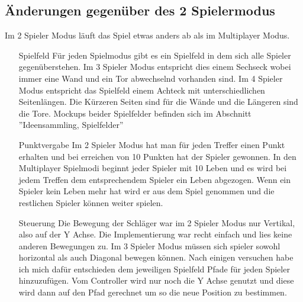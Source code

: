 \subsection{Änderungen gegenüber des 2 Spielermodus}
Im 2 Spieler Modus läuft das Spiel etwas anders ab als im Multiplayer Modus.
\begin{enumerate}
	\item[Spielfeld]
	Für jeden Spielmodus gibt es ein Spielfeld in dem sich alle Spieler gegenüberstehen.
	\newline
	Im 3 Spieler Modus entspricht dies einem Sechseck wobei immer eine Wand und ein Tor abwechselnd vorhanden sind.
	\newline
	Im 4 Spieler Modus entspricht das Spielfeld einem Achteck mit unterschiedlichen Seitenlängen. Die Kürzeren Seiten sind für die Wände und die Längeren sind die Tore.
	\newline
	Mockups beider Spielfelder befinden sich im Abschnitt ''Ideensammling, Spielfelder''
	
	\item[Punktvergabe]
	Im 2 Spieler Modus hat man für jeden Treffer einen Punkt erhalten und bei erreichen von 10 Punkten hat der Spieler gewonnen.
	\newline
	In den Multiplayer Spielmodi beginnt jeder Spieler mit 10 Leben und es wird bei jedem Treffen dem entsprechendem Spieler ein Leben abgezogen.
	\newline
	Wenn ein Spieler kein Leben mehr hat wird er aus dem Spiel genommen und die restlichen Spieler können weiter spielen.
	
	\item[Steuerung]
	Die Bewegung der Schläger war im 2 Spieler Modus nur Vertikal, also auf der Y Achse. Die Implementierung war recht einfach und lies keine anderen Bewegungen zu.
	\newline
	Im 3 Spieler Modus müssen sich spieler sowohl horizontal als auch Diagonal bewegen können.
	\newline
	Nach einigen versuchen habe ich mich dafür entschieden dem jeweiligen Spielfeld Pfade für jeden Spieler hinzuzufügen.
	\newline
	Vom Controller wird nur noch die Y Achse genutzt und diese wird dann auf den Pfad gerechnet um so die neue Position zu bestimmen.
\end{enumerate}
